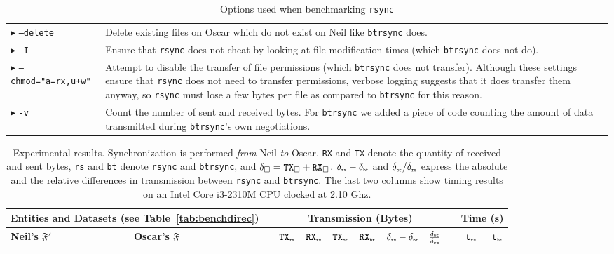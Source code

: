 \documentclass{llncs}
\newcommand{\btrsync}{\texttt{btrsync}\xspace}
\newcommand{\rsync}{\texttt{rsync}\xspace}
\begin{document}
\begin{table}
  \centering
  \caption{Options used when benchmarking \rsync}
  \label{tab:rsyncopt}
  \begin{tabular}{p{} p{}}
    \toprule
    $\blacktriangleright$ {\tt --delete} & Delete existing files on Oscar which
    do not exist on Neil like \btrsync does.\\
    $\blacktriangleright$ {\tt -I} & Ensure that \rsync does not cheat by
    looking at file modification times (which \btrsync does not do).\\
    $\blacktriangleright$ {\tt --chmod="a=rx,u+w"} & Attempt to disable the
    transfer of file permissions (which \btrsync does not transfer). Although
    these settings ensure that \rsync does not need to transfer permissions,
    verbose logging suggests that it does transfer them anyway, so \rsync must
    lose a few bytes per file as compared to \btrsync for this
    reason.\\
    $\blacktriangleright$ {\tt -v} & Count the number of sent and received
    bytes. For \btrsync we added a piece of code counting the amount of data
    transmitted during \btrsync's own negotiations.\\
    \bottomrule
  \end{tabular}\smallskip
\end{table}

\begin{table}
  \centering
  \caption{Experimental results. Synchronization is performed \textit{from} Neil \textit{to} Oscar. {\tt RX} and {\tt TX} denote the quantity of received and sent bytes, {\tt rs} and {\tt bt} denote {\tt rsync} and {\tt btrsync}, and $\delta_{\square}=\mbox{{\tt TX}}_{\square}+\mbox{{\tt RX}}_{\square}$. $\delta_{\mbox{{\tiny {\tt rs}}}}-\delta_{\mbox{{\tiny {\tt bt}}}}$ and ${\delta_{\mbox{{\tiny {\tt bt}}}}}/{\delta_{\mbox{{\tiny {\tt rs}}}}}$ express the absolute and the relative differences in transmission between \rsync and \btrsync. The last two columns show timing results on an Intel Core i3-2310M CPU clocked at 2.10 Ghz.}
  \label{tab:results}
  \setlength{\tabcolsep}{3pt}
  \begin{tabularx}{\textwidth}{ll X r r r r r r X r r }
    \toprule
    \multicolumn{2}{l}{\bf Entities and Datasets (see Table~\ref{tab:benchdirec})} &  &  \multicolumn{6}{c}{\bf Transmission (Bytes)} &  & \multicolumn{2}{r}{\bf Time (s)} \\
    \midrule {\bf Neil's $\mathfrak{F}'$}  & {\bf Oscar's $\mathfrak{F}$}
    & & $\mbox{{\tt TX}}_{\mbox{{\tiny {\tt rs}}}}$ & $\mbox{{\tt RX}}_{\mbox{{\tiny {\tt rs}}}}$  & $\mbox{{\tt TX}}_{\mbox{{\tiny {\tt bt}}}}$  & $\mbox{{\tt RX}}_{\mbox{{\tiny {\tt bt}}}}$  & $\delta_{\mbox{{\tiny {\tt rs}}}}-\delta_{\mbox{{\tiny {\tt bt}}}}$ &
    $\frac{\delta_{\mbox{{\tiny {\tt bt}}}}}{\delta_{\mbox{{\tiny {\tt rs}}}}}$ & & $\mbox{{\tt t}}_{\mbox{{\tiny {\tt rs}}}}$ & $\mbox{{\tt t}}_{\mbox{{\tiny {\tt bt}}}}$ \\\midrule
    
    \bottomrule
  \end{tabularx}\smallskip
\end{table}
\end{document}
